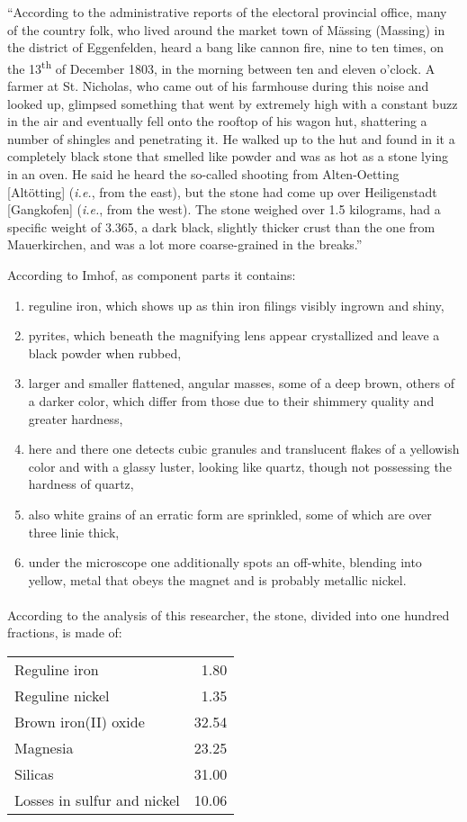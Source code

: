 \documentclass[a4paper, 12pt, oneside]{article}
\begin{document}
``According to the administrative reports of the electoral provincial office, many of the country folk, who lived around the market town of Mässing (Massing) in the district of Eggenfelden, heard a bang like cannon fire, nine to ten times, on the 13\textsuperscript{th} of December 1803, in the morning between ten and eleven o'clock. A farmer at St. Nicholas, who came out of his farmhouse during this noise and looked up, glimpsed something that went by extremely high with a constant buzz in the air and eventually fell onto the rooftop of his wagon hut, shattering a number of shingles and penetrating it. He walked up to the hut and found in it a completely black stone that smelled like powder and was as hot as a stone lying in an oven. He said he heard the so-called shooting from Alten-Oetting [Altötting] (\emph{i.e.}, from the east), but the stone had come up over Heiligenstadt [Gangkofen] (\emph{i.e.}, from the west). The stone weighed over 1.5 kilograms, had a specific weight of 3.365, a dark black, slightly thicker crust than the one from Mauerkirchen, and was a lot more coarse-grained in the breaks.''

According to Imhof, as component parts it contains:
\begin{enumerate}
    \item reguline iron, which shows up as thin iron filings visibly ingrown and shiny,
    \item pyrites, which beneath the magnifying lens appear crystallized and leave a black powder when rubbed,
    \item larger and smaller flattened, angular masses, some of a deep brown, others of a darker color, which differ from those due to their shimmery quality and greater hardness,
    \item here and there one detects cubic granules and translucent flakes of a yellowish color and with a glassy luster, looking like quartz, though not possessing the hardness of quartz,
    \item also white grains of an erratic form are sprinkled, some of which are over three linie thick,
    \item under the microscope one additionally spots an off-white, blending into yellow, metal that obeys the magnet and is probably metallic nickel.
\end{enumerate}
\paragraph*{}
According to the analysis of this researcher, the stone, divided into one hundred fractions, is made of:
\begin{center}
    \begin{tabular}{l r}
        Reguline iron & 1.80\\
        Reguline nickel & 1.35\\
        Brown iron(II) oxide & 32.54\\
        Magnesia & 23.25\\
        Silicas & 31.00\\
        Losses in sulfur and nickel & 10.06\\
    \end{tabular}
\end{center}
\end{document}

